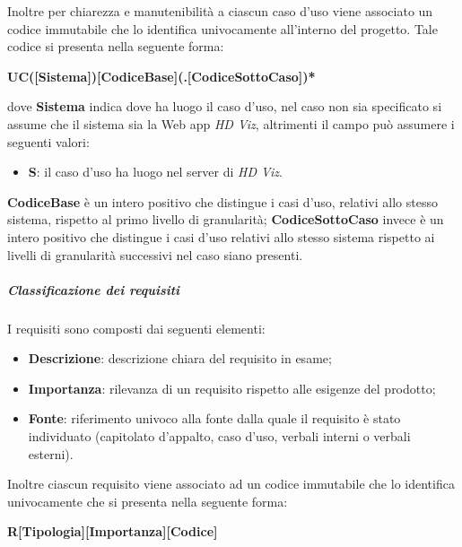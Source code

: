 Inoltre per chiarezza e manutenibilità a ciascun caso d'uso viene associato un codice immutabile che lo identifica univocamente
all'interno del progetto. Tale codice si presenta nella seguente forma:
\begin{center}
    \textbf{UC([Sistema])[CodiceBase](.[CodiceSottoCaso])*}
\end{center}
dove \textbf{Sistema} indica dove ha luogo il caso d'uso, nel caso non sia specificato si assume che il sistema sia la Web app
\emph{HD Viz}, altrimenti il campo può assumere i seguenti valori:
\begin{itemize}
	\item \textbf{S}: il caso d'uso ha luogo nel server di \emph{HD Viz}.
\end{itemize}
\textbf{CodiceBase} è un intero positivo che distingue i casi d'uso, relativi allo stesso sistema, rispetto al primo livello di
granularità; \textbf{CodiceSottoCaso} invece è un intero positivo che distingue i casi d'uso relativi allo stesso sistema rispetto ai
livelli di granularità successivi nel caso siano presenti.

\subparagraph{Classificazione dei requisiti}
\label{par:classificazione_requisiti}
I requisiti sono composti dai seguenti elementi:
\begin{itemize}
	\item \textbf{Descrizione}: descrizione chiara del requisito in esame;
	\item \textbf{Importanza}: rilevanza di un requisito rispetto alle esigenze del prodotto;
	\item \textbf{Fonte}: riferimento univoco alla fonte dalla quale il requisito è stato individuato (capitolato d'appalto, caso d'uso,
		verbali interni o verbali esterni).
\end{itemize}

Inoltre ciascun requisito viene associato ad un codice immutabile che lo identifica univocamente che si presenta nella seguente forma:
\begin{center}
    \textbf{R[Tipologia][Importanza][Codice]}
\end{center}

